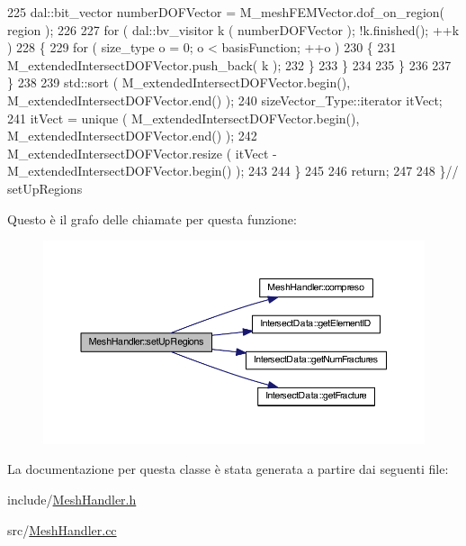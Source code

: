 \begin{DoxyCode}
225                         dal::bit\_vector numberDOFVector = M\_meshFEMVector.dof\_on\_region( region );
226 
227                         \textcolor{keywordflow}{for} ( dal::bv\_visitor k ( numberDOFVector ); !k.finished(); ++k )
228                         \{
229                                 \textcolor{keywordflow}{for} ( size\_type o = 0; o < basisFunction; ++o )
230                                 \{
231                                         M\_extendedIntersectDOFVector.push\_back( k );
232                                 \}
233                         \}
234 
235                 \}
236 
237         \}
238 
239         std::sort ( M\_extendedIntersectDOFVector.begin(), M\_extendedIntersectDOFVector.end() );
240         sizeVector\_Type::iterator itVect;
241         itVect = unique ( M\_extendedIntersectDOFVector.begin(), M\_extendedIntersectDOFVector.end() );
242         M\_extendedIntersectDOFVector.resize ( itVect - M\_extendedIntersectDOFVector.begin() );
243 
244     \}
245     
246     \textcolor{keywordflow}{return};
247 
248 \}\textcolor{comment}{// setUpRegions}
\end{DoxyCode}


Questo è il grafo delle chiamate per questa funzione\-:\nopagebreak
\begin{figure}[H]
\begin{center}
\leavevmode
\includegraphics[width=350pt]{classMeshHandler_ad25f2a8ce85bcf1d5044e7de829a722a_cgraph}
\end{center}
\end{figure}




La documentazione per questa classe è stata generata a partire dai seguenti file\-:\begin{DoxyCompactItemize}
\item 
include/\hyperlink{MeshHandler_8h}{Mesh\-Handler.\-h}\item 
src/\hyperlink{MeshHandler_8cc}{Mesh\-Handler.\-cc}\end{DoxyCompactItemize}
